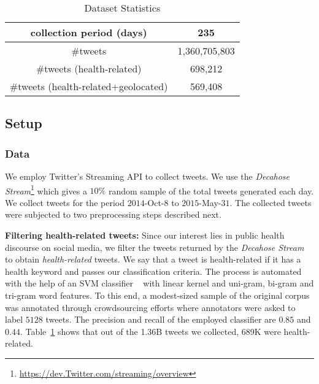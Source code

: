 \begin{table}
\centering
\caption{Dataset Statistics}
\label{tab:data:stats}
\begin{tabular}{|c||c|}
\hline
collection period (days) & 235\\
\hline
\#tweets & {1,360,705,803}\\
\hline
\#tweets (health-related) & 698,212\\
\hline
\#tweets (health-related+geolocated) & 569,408\\
\hline
\end{tabular}
\end{table}
\subsection{Setup}
\label{subsec:setup}
\subsubsection{Data}

We employ Twitter's Streaming API to collect tweets. We use the \emph{Decahose Stream}\footnote{\url{https://dev.Twitter.com/streaming/overview}} which gives a $10\%$ random sample of the total tweets generated 
each day. We collect tweets for the period $2014$-Oct-$8$ to $2015$-May-$31$.
The collected tweets were subjected to two preprocessing steps described next.

{\bf Filtering health-related tweets:} Since our interest lies 
in public health discourse on social media, we filter the tweets 
returned by the \emph{Decahose Stream} to obtain \emph{health-related} 
tweets. We say that a tweet is health-related if it has a health 
keyword and passes our classification criteria.
The process is automated with the help of an SVM classifier
 ~\cite{DBLP:journals/ml/CortesV95}
with linear kernel and uni-gram, bi-gram and tri-gram word 
features. To this end, a modest-sized sample of the original 
corpus was annotated through crowdsourcing efforts where annotators 
were asked to label $5128$ tweets. The precision and recall of the 
employed classifier are $0.85$ and $0.44$. Table~\ref{tab:data:stats} 
shows that out of the 1.36B tweets we collected, 689K were health-related. 

